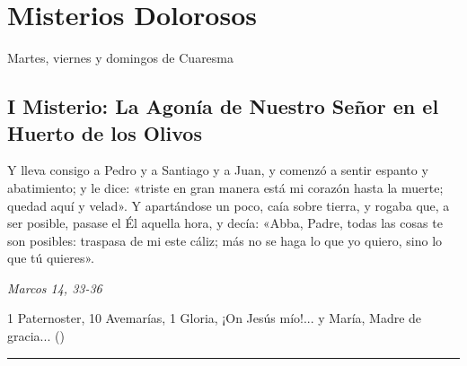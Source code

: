 \documentclass[./rosary.tex]{subfiles}
\begin{document}
\section*{Misterios Dolorosos}
Martes, viernes y domingos de Cuaresma

\subsection*{I Misterio: La Agonía de Nuestro Señor en el Huerto de los Olivos}

Y lleva consigo a Pedro y a Santiago y a Juan, y comenzó a sentir espanto y abatimiento; y le dice:
«triste en gran manera está mi corazón hasta la muerte; quedad aquí y velad». Y apartándose un poco,
caía sobre tierra, y rogaba que, a ser posible, pasase el Él aquella hora, y decía: «Abba, Padre, todas las cosas te son posibles:
traspasa de mi este cáliz; más no se haga lo que yo quiero, sino lo que tú quieres».

\begin{flushright}
      \emph{Marcos 14, 33-36}
\end{flushright}

1 Paternoster, 10 Avemarías, 1 Gloria, ¡On Jesús mío!... y María, Madre de gracia... ()

\rule{\textwidth}{0.5pt}
\end{document}
